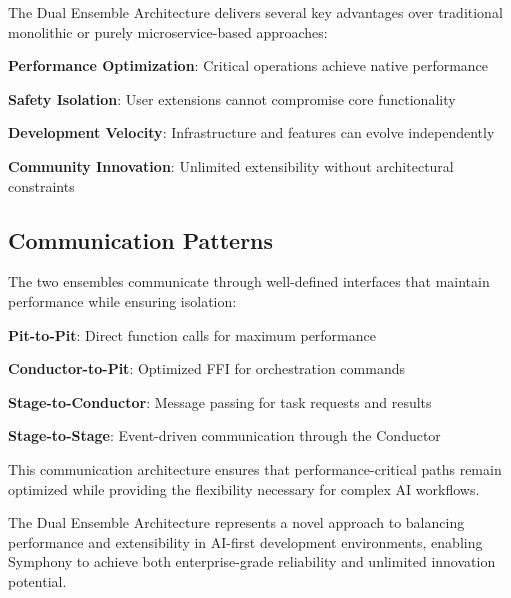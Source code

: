The Dual Ensemble Architecture delivers several key advantages over traditional monolithic or purely microservice-based approaches:

\begin{infobox}[title=Dual Ensemble Advantages]
\begin{compactlist}
    \item \textbf{Performance Optimization}: Critical operations achieve native performance
    \item \textbf{Safety Isolation}: User extensions cannot compromise core functionality
    \item \textbf{Development Velocity}: Infrastructure and features can evolve independently
    \item \textbf{Community Innovation}: Unlimited extensibility without architectural constraints
\end{compactlist}
\end{infobox}

\subsection*{Communication Patterns}

The two ensembles communicate through well-defined interfaces that maintain performance while ensuring isolation:

\begin{compactlist}
    \item \textbf{Pit-to-Pit}: Direct function calls for maximum performance
    \item \textbf{Conductor-to-Pit}: Optimized FFI for orchestration commands
    \item \textbf{Stage-to-Conductor}: Message passing for task requests and results
    \item \textbf{Stage-to-Stage}: Event-driven communication through the Conductor
\end{compactlist}

This communication architecture ensures that performance-critical paths remain optimized while providing the flexibility necessary for complex AI workflows.

\begin{successbox}
The Dual Ensemble Architecture represents a novel approach to balancing performance and extensibility in AI-first development environments, enabling Symphony to achieve both enterprise-grade reliability and unlimited innovation potential.
\end{successbox}
